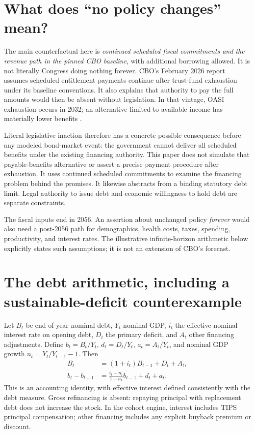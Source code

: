 \documentclass[11pt]{article}
\begin{document}
\section{What does ``no policy changes'' mean?}

The main counterfactual here is \emph{continued scheduled fiscal commitments and the revenue
path in the pinned CBO baseline}, with additional borrowing allowed. It is not literally
Congress doing nothing forever. CBO's February 2026 report assumes scheduled entitlement
payments continue after trust-fund exhaustion under its baseline conventions. It also
explains that authority to pay the full amounts would then be absent without legislation.
In that vintage, OASI exhaustion occurs in 2032; an alternative limited to available income
has materially lower benefits \cite{cbo2026}.

Literal legislative inaction therefore has a concrete possible consequence before any
modeled bond-market event: the government cannot deliver all scheduled benefits under the
existing financing authority. This paper does not simulate that payable-benefits alternative
or assert a precise payment procedure after exhaustion. It uses continued scheduled
commitments to examine the financing problem behind the promises. It likewise abstracts
from a binding statutory debt limit. Legal authority to issue debt and economic willingness
to hold debt are separate constraints.

The fiscal inputs end in 2056. An assertion about unchanged policy \emph{forever} would also
need a post-2056 path for demographics, health costs, taxes, spending, productivity, and
interest rates. The illustrative infinite-horizon arithmetic below explicitly states such
assumptions; it is not an extension of CBO's forecast.

\section{The debt arithmetic, including a sustainable-deficit counterexample}

Let $B_t$ be end-of-year nominal debt, $Y_t$ nominal GDP, $i_t$ the effective nominal
interest rate on opening debt, $D_t$ the primary deficit, and $A_t$ other financing
adjustments. Define $b_t=B_t/Y_t$, $d_t=D_t/Y_t$, $a_t=A_t/Y_t$, and nominal GDP growth
$n_t=Y_t/Y_{t-1}-1$. Then
\begin{align}
B_t &= (1+i_t)B_{t-1}+D_t+A_t,\\
b_t-b_{t-1} &= \frac{i_t-n_t}{1+n_t}b_{t-1}+d_t+a_t.
\label{eq:debt}
\end{align}
This is an accounting identity, with effective interest defined consistently with the debt
measure. Gross refinancing is absent: repaying principal with replacement debt does not
increase the stock. In the cohort engine, interest includes TIPS principal compensation;
other financing includes any explicit buyback premium or discount.
\end{document}
